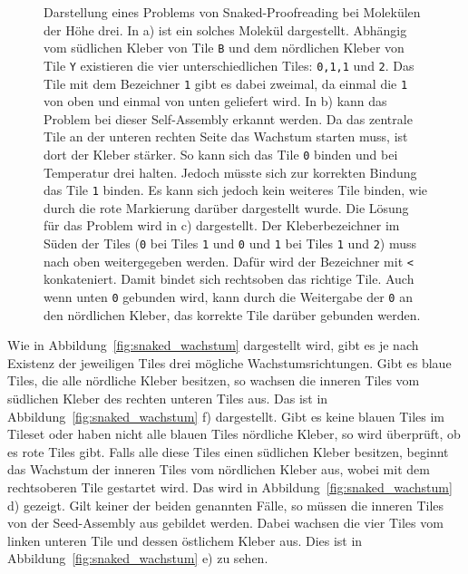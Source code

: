 \begin{figure}
    \caption[Snaked-Proofreading Problem für Moleküle der Höhe drei.]{Darstellung eines Problems von Snaked-Proofreading bei Molekülen der Höhe drei. In a) ist ein solches Molekül dargestellt. Abhängig vom südlichen Kleber von Tile \texttt{B} und dem nördlichen Kleber von Tile \texttt{Y} existieren die vier unterschiedlichen Tiles: \texttt{0,1,1} und \texttt{2}. Das Tile mit dem Bezeichner \texttt{1} gibt es dabei zweimal, da einmal die \texttt{1} von oben und einmal von unten geliefert wird. In b) kann das Problem bei dieser Self-Assembly erkannt werden. Da das zentrale Tile an der unteren rechten Seite das Wachstum starten muss, ist dort der Kleber stärker. So kann sich das Tile \texttt{0} binden und bei Temperatur drei halten. Jedoch müsste sich zur korrekten Bindung das Tile \texttt{1} binden. Es kann sich jedoch kein weiteres Tile binden, wie durch die rote Markierung darüber dargestellt wurde. Die Lösung für das Problem wird in c) dargestellt. Der Kleberbezeichner im Süden der Tiles (\texttt{0} bei Tiles \texttt{1} und \texttt{0} und \texttt{1} bei Tiles \texttt{1} und \texttt{2}) muss nach oben weitergegeben werden. Dafür wird der Bezeichner mit \texttt{<} konkateniert. Damit bindet sich rechtsoben das richtige Tile. Auch wenn unten \texttt{0} gebunden wird, kann durch die Weitergabe der \texttt{0} an den nördlichen Kleber, das korrekte Tile darüber gebunden werden.}
    \label{fig:assembly_problem}
\end{figure}

Wie in Abbildung~\ref{fig:snaked_wachstum} dargestellt wird, gibt es je nach Existenz der jeweiligen Tiles drei mögliche Wachstumsrichtungen. Gibt es blaue Tiles, die alle nördliche Kleber besitzen, so wachsen die inneren Tiles vom südlichen Kleber des rechten unteren Tiles aus. Das ist in Abbildung~\ref{fig:snaked_wachstum} f) dargestellt. Gibt es keine blauen Tiles im Tileset oder haben nicht alle blauen Tiles nördliche Kleber, so wird überprüft, ob es rote Tiles gibt. Falls alle diese Tiles einen südlichen Kleber besitzen, beginnt das Wachstum der inneren Tiles vom nördlichen Kleber aus, wobei mit dem rechtsoberen Tile gestartet wird. Das wird in Abbildung~\ref{fig:snaked_wachstum} d) gezeigt. Gilt keiner der beiden genannten Fälle, so müssen die inneren Tiles von der Seed-Assembly aus gebildet werden. Dabei wachsen die vier Tiles vom linken unteren Tile und dessen östlichem Kleber aus. Dies ist in Abbildung~\ref{fig:snaked_wachstum} e) zu sehen.

